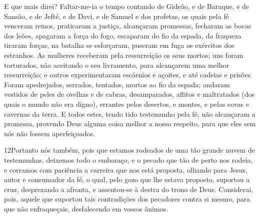 E que mais direi? Faltar-me-ia o tempo contando de Gideão, e de
Baraque, e de Sansão, e de Jefté, e de Davi, e de Samuel e dos
profetas, os quais pela fé venceram reinos, praticaram a
justiça, alcançaram promessas, fecharam as bocas dos leões,
apagaram a força do fogo, escaparam do fio da espada, da
fraqueza tiraram forças, na batalha se esforçaram, puseram em fuga
os exércitos dos estranhos. As mulheres receberam pela
ressurreição os seus mortos; uns foram torturados, não aceitando o
seu livramento, para alcançarem uma melhor ressurreição; e
outros experimentaram escárnios e açoites, e até cadeias e prisões.
Foram apedrejados, serrados, tentados, mortos ao fio da
espada; andaram vestidos de peles de ovelhas e de cabras,
desamparados, aflitos e maltratados (dos quais o mundo não
era digno), errantes pelos desertos, e montes, e pelas covas e
cavernas da terra. E todos estes, tendo tido testemunho pela
fé, não alcançaram a promessa, provendo Deus alguma coisa
melhor a nosso respeito, para que eles sem nós não fossem
aperfeiçoados.

\medskip

\lettrine{12} Portanto nós também, pois que estamos rodeados
de uma tão grande nuvem de testemunhas, deixemos todo o embaraço, e
o pecado que tão de perto nos rodeia, e corramos com paciência a
carreira que nos está proposta, olhando para Jesus, autor e
consumador da fé, o qual, pelo gozo que lhe estava proposto,
suportou a cruz, desprezando a afronta, e assentou-se à destra do
trono de Deus. Considerai, pois, aquele que suportou tais
contradições dos pecadores contra si mesmo, para que não
enfraqueçais, desfalecendo em vossos ânimos.

